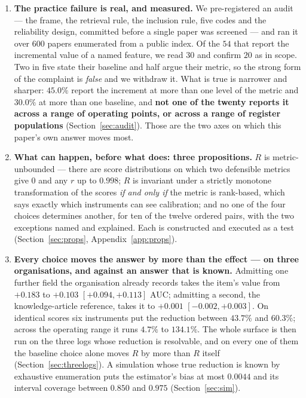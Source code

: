 \documentclass[preprint,12pt]{elsarticle}
\begin{document}
\begin{enumerate}
\item \textbf{The practice failure is real, and measured.} We pre-registered
an audit --- the frame, the retrieval rule, the inclusion rule, five codes and
the reliability design, committed before a single paper was screened --- and
ran it over $600$ papers enumerated from a public index. Of the $54$ that
report the incremental value of a named feature, we read $30$ and confirm $20$
as in scope. Two in five state their baseline and half argue their metric, so
the strong form of the complaint is \emph{false} and we withdraw it. What is
true is narrower and sharper: $45.0\%$ report the increment at more than one
level of the metric and $30.0\%$ at more than one baseline, and \textbf{not
one of the twenty reports it across a range of operating points, or across a
range of register populations} (Section~\ref{sec:audit}). Those are the two
axes on which this paper's own answer moves most.

\item \textbf{What can happen, before what does: three propositions.} $R$ is
metric-unbounded --- there are score distributions on which two defensible
metrics give $0$ and any $r$ up to $0.998$; $R$ is invariant under a strictly
monotone transformation of the scores \emph{if and only if} the metric is
rank-based, which says exactly which instruments can see calibration; and no
one of the four choices determines another, for ten of the twelve ordered
pairs, with the two exceptions named and explained. Each is constructed and
executed as a test (Section~\ref{sec:props}, Appendix~\ref{app:props}).

\item \textbf{Every choice moves the answer by more than the effect --- on
three organisations, and against an answer that is known.} Admitting one
further field the organisation already records takes the item's value from
$+0.183$ to $+0.103$ $[+0.094,+0.113]$ AUC; admitting a second, the
knowledge-article reference, takes it to $+0.001$ $[-0.002,+0.003]$. On
identical scores six instruments put the reduction between $43.7\%$ and
$60.3\%$; across the operating range it runs $4.7\%$ to $134.1\%$. The whole
surface is then run on the three logs whose reduction is resolvable, and on
every one of them the baseline choice alone moves $R$ by more than $R$ itself
(Section~\ref{sec:threelogs}). A simulation whose true reduction is known by
exhaustive enumeration puts the estimator's bias at most $0.0044$ and its
interval coverage between $0.850$ and $0.975$ (Section~\ref{sec:sim}).


\end{enumerate}
\end{document}
